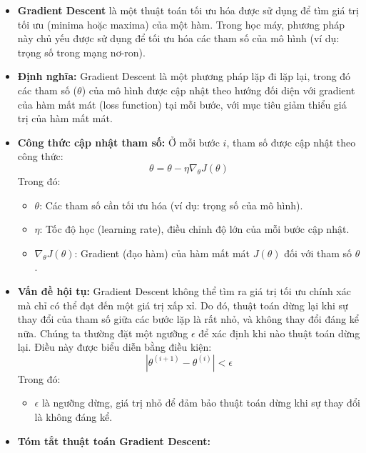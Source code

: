 \documentclass[final,letterpaper,twoside,12pt]{report}
\begin{document}
\begin{itemize}
	\item \textbf{Gradient Descent} là một thuật toán tối ưu hóa được sử dụng để tìm giá trị tối ưu (minima hoặc maxima) của một hàm. Trong học máy, phương pháp này chủ yếu được sử dụng để tối ưu hóa các tham số của mô hình (ví dụ: trọng số trong mạng nơ-ron).

	\item \textbf{Định nghĩa:} Gradient Descent là một phương pháp lặp đi lặp lại, trong đó các tham số (\(\theta\)) của mô hình được cập nhật theo hướng đối diện với gradient của hàm mất mát (loss function) tại mỗi bước, với mục tiêu giảm thiểu giá trị của hàm mất mát.

	\item \textbf{Công thức cập nhật tham số:} Ở mỗi bước \(i\), tham số được cập nhật theo công thức:
	      $$
		      \theta = \theta - \eta \nabla_\theta J(\theta)
	      $$
	      Trong đó:
	      \begin{itemize}
		      \item \(\theta\): Các tham số cần tối ưu hóa (ví dụ: trọng số của mô hình).
		      \item \(\eta\): Tốc độ học (learning rate), điều chỉnh độ lớn của mỗi bước cập nhật.
		      \item \(\nabla_\theta J(\theta)\): Gradient (đạo hàm) của hàm mất mát \(J(\theta)\) đối với tham số \(\theta\).
	      \end{itemize}

	\item \textbf{Vấn đề hội tụ:} Gradient Descent không thể tìm ra giá trị tối ưu chính xác mà chỉ có thể đạt đến một giá trị xấp xỉ. Do đó, thuật toán dừng lại khi sự thay đổi của tham số giữa các bước lặp là rất nhỏ, và không thay đổi đáng kể nữa. Chúng ta thường đặt một ngưỡng \(\epsilon\) để xác định khi nào thuật toán dừng lại. Điều này được biểu diễn bằng điều kiện:
	      $$
		      \left|\theta^{(i+1)} - \theta^{(i)}\right| < \epsilon
	      $$
	      Trong đó:
	      \begin{itemize}
		      \item \(\epsilon\) là ngưỡng dừng, giá trị nhỏ để đảm bảo thuật toán dừng khi sự thay đổi là không đáng kể.
	      \end{itemize}

	      \newpage

	\item \textbf{Tóm tắt thuật toán Gradient Descent:}
\end{itemize}
\end{document}
